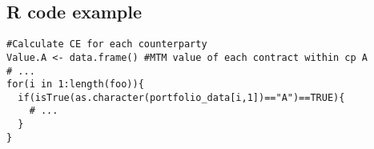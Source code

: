 \subsection*{R code example}

\begin{lstlisting}
#Calculate CE for each counterparty
Value.A <- data.frame() #MTM value of each contract within cp A
# ...
for(i in 1:length(foo)){
  if(isTrue(as.character(portfolio_data[i,1])=="A")==TRUE){
    # ...
  }
}
\end{lstlisting}